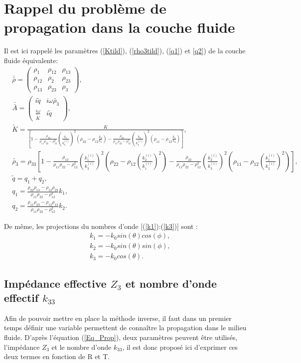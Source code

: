 \documentclass[12pt]{report}
\begin{document}
\section{Rappel du problème de propagation dans la couche fluide}
\label{Ch_Inv_S_Pb}
    Il est ici rappelé  les paramètres (\ref{Ktild}), (\ref{rho3tild}), (\ref{q1}) et \ref{q2})  de la couche fluide équivalente:
    \begin{align*}
	    &\bar{\bar{\rho}}=\begin{pmatrix} \rho_1 & \rho_{12} & \rho_{13} \\ \rho_{12} & \rho_2 & \rho_{23} \\ \rho_{13} & \rho_{23} & \rho_3 \end{pmatrix},\\
        &\bar{\bar{A}}=\begin{pmatrix} i \tilde{q} & i \omega \tilde{\rho_3} \\ \frac{i \omega}{\tilde{K}} & i \tilde{q} \end{pmatrix},\\
	    &\tilde{K}=\frac{K}{[1-\frac{\rho_{33}}{\rho_{11}\rho_{22}-\rho_{12}^2}(\frac{k_1}{k_3^{(i)}})^2(\rho_{22}-\rho_{12}\frac{k_2}{k_1})-\frac{\rho_{33}}{\rho_{11}\rho_{22}-\rho_{12}^2}(\frac{k_2}{k_3^{(i)}})^2(\rho_{11}-\rho_{12}\frac{k_1}{k_2})]},\\
        &\tilde{\rho_3}=\rho_{33}[1-\frac{\rho_{13}}{\rho_{11}\rho_{22}-\rho_{12}^2}(\frac{k_1^{(i)}}{k_3^{(i)}})^2(\rho_{22}-\rho_{12}(\frac{k_2^{(i)}}{k_1^{(i)}})^2)-\frac{\rho_{23}}{\rho_{11}\rho_{22}-\rho_{12}^2}(\frac{k_2^{(i)}}{k_3^{(i)}})^2(\rho_{11}-\rho_{12}(\frac{k_1^{(i)}}{k_2^{(i)}})^2)], \\
        &\tilde{q}=q_1+q_2,\\
	    &q_{1}=\frac{\rho_{22}\rho_{13}-\rho_{12}\rho_{23}}{\rho_{11}\rho_{22}-\rho_{12}^2}k_1,\\
        &q_{2}= \frac{\rho_{11}\rho_{23}-\rho_{12}\rho_{13}}{\rho_{11}\rho_{22}-\rho_{12}^2}k_2.
    \end{align*}
    
    De même, les projections du nombres d'onde [(\ref{k1}):(\ref{k3})] sont :
    \begin{align*}
    &k_1=-k_0 sin(\theta) cos(\phi), \\
    &k_2=-k_0 sin(\theta) sin(\phi), \\
    &k_3= -k_0 cos(\theta).
    \end{align*}
          
     
\subsection{Impédance effective $Z_3$ et nombre d'onde effectif $k_{33}$}
    Afin de pouvoir mettre en place la méthode inverse, il faut dans un premier temps définir une variable permettent de connaître la propagation dans le milieu fluide. D'après l'équation (\ref{Eq_Prop}), deux paramètres peuvent être utilisés, l'impédance $Z_3$ et le nombre d'onde $k_{33}$, il est donc proposé ici d'exprimer ces deux termes en fonction de R et T.
    
\end{document}
